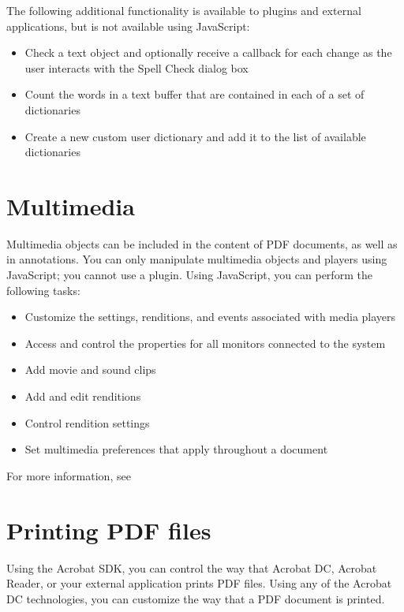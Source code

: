 \documentclass[letterpaper,12pt,english,openany,oneside]{sphinxmanual}
\begin{document}
The following additional functionality is available to plug\sphinxhyphen{}ins and external applications, but is not available using JavaScript:
\begin{itemize}
\item {} 
Check a text object and optionally receive a callback for each change as the user interacts with the Spell Check dialog box

\item {} 
Count the words in a text buffer that are contained in each of a set of dictionaries

\item {} 
Create a new custom user dictionary and add it to the list of available dictionaries

\end{itemize}




\section{Multimedia}
\label{\detokenize{Overview_Editing:multimedia}}
Multimedia objects can be included in the content of PDF documents, as well as in annotations. You can only manipulate multimedia objects and players using JavaScript; you cannot use a plug\sphinxhyphen{}in. Using JavaScript, you can perform the following tasks:
\begin{itemize}
\item {} 
Customize the settings, renditions, and events associated with media players

\item {} 
Access and control the properties for all monitors connected to the system

\item {} 
Add movie and sound clips

\item {} 
Add and edit renditions

\item {} 
Control rendition settings

\item {} 
Set multimedia preferences that apply throughout a document

\end{itemize}

For more information, see 




\section{Printing PDF files}
\label{\detokenize{Overview_Editing:printing-pdf-files}}
Using the Acrobat SDK, you can control the way that Acrobat DC, Acrobat Reader, or your external application prints PDF files. Using any of the Acrobat DC technologies, you can customize the way that a PDF document is printed.
\end{document}
